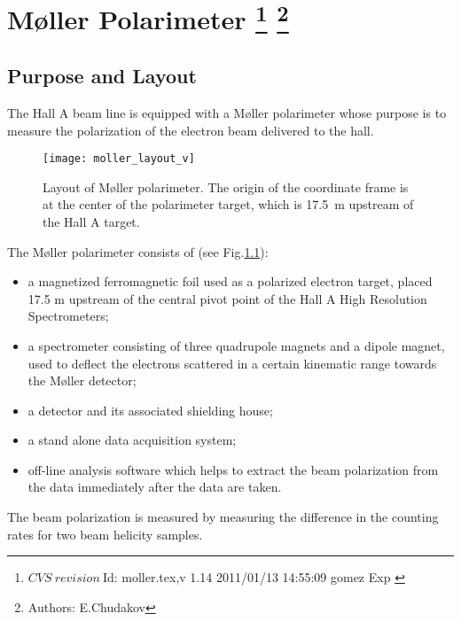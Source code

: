 \chapter[M{\o}ller Polarimeter]{M{\o}ller Polarimeter
\label{sec:moller}
\footnote{
  $CVS~revision~ $Id: moller.tex,v 1.14 2011/01/13 14:55:09 gomez Exp $ $
}
\footnote{Authors: E.Chudakov }
}
\section {Purpose and Layout}
\label{sec:moller_purpose}

The Hall A beam line is equipped with a M{\o}ller 
polarimeter
whose purpose is 
to measure the polarization of the electron beam delivered to the hall. 

 \begin{figure}[bht]
    \begin{center}
        \texttt{[image: moller\_layout\_v]}
    \end{center}
    \caption[M{\o}ller: layout]{
            Layout of M{\o}ller polarimeter. The origin of the 
            coordinate frame is at the center of the polarimeter
             target, which is 17.5~m upstream of the Hall A target.
            }
    \label{fig:moller_layout} 
 \end{figure}  

The M{\o}ller polarimeter consists of (see Fig.\ref{fig:moller_layout}):
\begin{itemize}
\item  a magnetized ferromagnetic foil used as a polarized electron target,
       placed 17.5 m upstream of the central 
       pivot point of the Hall A High Resolution Spectrometers;

\item a spectrometer consisting of three quadrupole magnets and a dipole magnet,
      used to deflect the electrons scattered in a certain kinematic
      range towards the M{\o}ller detector;

\item a detector and its associated shielding house;
\item a stand alone data acquisition system;
\item off-line analysis software which helps to extract the beam polarization
      from the data immediately after the data are taken. 
\end{itemize}

The beam polarization is measured by measuring the difference
in the counting rates for two beam helicity samples.  

